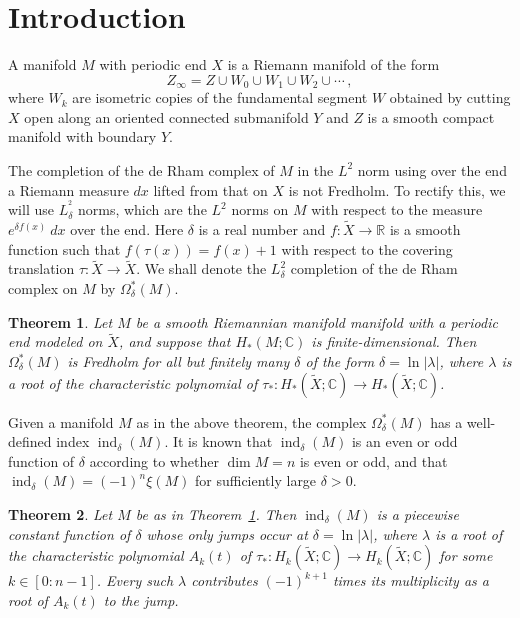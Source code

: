 \documentclass[a4paper, 12pt]{article}
\newtheorem{theorem}{Theorem}[section]
\begin{document}
\section{Introduction}

A manifold \({ M }\) with periodic end \({ X }\) is a Riemann manifold of the form \[
    Z_{\infty} = Z \cup W_0 \cup W_1 \cup W_2 \cup \cdots\,,
\] where \({ W_{k} }\) are isometric copies of the fundamental segment \({ W }\) obtained by cutting \({ X }\) open along an oriented connected submanifold \({ Y }\) and \({ Z }\) is a smooth compact manifold with boundary \({ Y }\). 

The completion of the de Rham complex of \({ M }\) in the \({ L^{2} }\) norm using over the end a Riemann measure \({ dx }\) lifted from that on \({ X }\) is not Fredholm. To rectify this, we will use \({ L_{\delta}^{^2} }\) norms, which are the \({ L^{2} }\) norms on \({ M }\) with respect to the measure \({ e^{\delta f(x)}\: dx }\) over the end. Here \({ \delta }\) is a real number and \({ f : \tilde X \to \mathbb R }\) is a smooth function such that \({ f(\tau(x)) = f(x) + 1 }\) with respect to the covering translation \({ \tau : \tilde X \to \tilde X }\). We shall denote the \({ L_{\delta}^2 }\) completion of the de Rham complex on \({ M }\) by \({ \Omega_{\delta}^*(M) }\).

\begin{theorem}
    \label{thm:Omega_delta_is_Fredholm}
    Let \({ M }\) be a smooth Riemannian manifold manifold with a periodic end modeled on \({ \tilde X }\), and suppose that \({ H_{*}(M; \mathbb C) }\) is finite-dimensional. Then \({ \Omega_{\delta}^*(M) }\) is Fredholm for all but finitely many \({ \delta }\) of the form \({ \delta = \ln \lvert \lambda \rvert }\), where \({ \lambda }\) is a root of the characteristic polynomial of \({ \tau_{*} : H_{*}(\tilde X; \mathbb C) \to H_{*}(\tilde X; \mathbb C) }\).
\end{theorem}

Given a manifold \({ M }\) as in the above theorem, the complex \({ \Omega_{\delta}^*(M) }\) has a well-defined index \({ \operatorname{ind}_{\delta}(M) }\). It is known that \({ \operatorname{ind}_{\delta}(M) }\) is an even or odd function of \({ \delta }\) according to whether \({ \dim M = n }\) is even or odd, and that \({ \operatorname{ind}_{\delta}(M) = (-1)^{n} \xi(M) }\) for sufficiently large \({ \delta > 0 }\).

\begin{theorem}
    Let \({ M }\) be as in Theorem~\ref{thm:Omega_delta_is_Fredholm}. Then \({ \operatorname{ind}_{\delta}(M) }\) is a piecewise constant function of \({ \delta }\) whose only jumps occur at \({ \delta = \ln \lvert \lambda \rvert }\), where \({ \lambda }\) is a root of the char\-ac\-ter\-is\-tic polynomial \({ A_{k}(t) }\) of \({ \tau_{*} : H_{k}(\tilde X; \mathbb C) \to H_{k}(\tilde X; \mathbb C) }\) for some \({ k \in [0 : n-1] }\). Every such \({ \lambda }\) contributes \({ (-1)^{k+1} }\) times its multiplicity as a root of \({ A_{k}(t) }\) to the jump.
\end{theorem}
\end{document}
